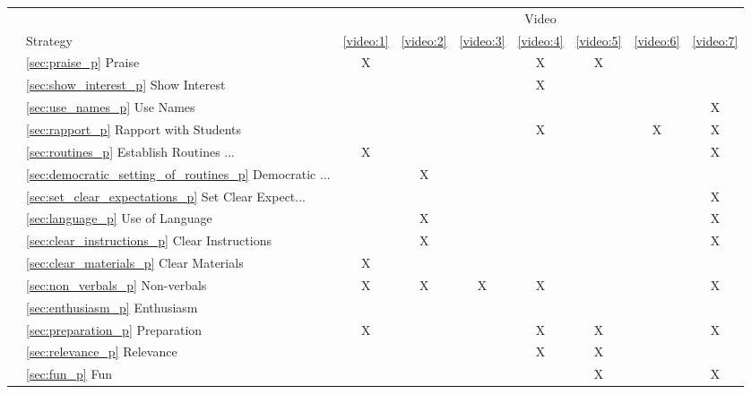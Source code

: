 \documentclass[12pt]{report}
\begin{document}
\pagebreak
\begin{longtable}{rl|c|c|c|c|c|c|c|}

 & & \multicolumn{7}{|c|}{Video} \\
 & Strategy & \ref{video:1} & \ref{video:2} & \ref{video:3} & \ref{video:4} & \ref{video:5} & \ref{video:6} & \ref{video:7} \\ \hline
\endhead
\parbox[t]{2mm}{}
& \ref{sec:praise_p}  Praise                                   &X& & &X&X& & \\
& \ref{sec:show_interest_p} Show Interest                             & & & &X& & & \\
& \ref{sec:use_names_p} Use Names                                 & & & & & & &X\\
& \ref{sec:rapport_p} Rapport with Students                                   & & & &X& &X&X\\
& \ref{sec:routines_p}  Establish Routines ...                              &X& & & & & &X\\
& \hspace{6pt}\ref{sec:democratic_setting_of_routines_p} Democratic ... & &X& & & & & \\
& \hspace{6pt}\ref{sec:set_clear_expectations_p} Set Clear Expect...       & & & & & & &X\\
& \ref{sec:language_p} Use of Language                                   & &X& & & & &X\\
& \hspace{6pt}\ref{sec:clear_instructions_p} Clear Instructions             & &X& & & & &X\\
& \hspace{6pt}\ref{sec:clear_materials_p} Clear Materials                &X& & & & & & \\
& \ref{sec:non_verbals_p} Non-verbals                                &X&X&X&X& & &X\\
& \hspace{6pt}\ref{sec:enthusiasm_p} Enthusiasm                    & & & & & & & \\
& \ref{sec:preparation_p} Preparation                                 &X& & &X&X& &X\\
& \hspace{6pt}\ref{sec:relevance_p} Relevance                      & & & &X&X& & \\
& \hspace{6pt}\ref{sec:fun_p} Fun                            & & & & &X& &X\\

\end{longtable}
\end{document}
